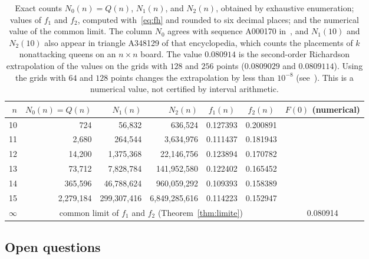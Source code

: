 \begin{table}[ht] \centering \small \begin{tabular}{rrrrccc}
\toprule
$n$ & $N_0(n)=Q(n)$ & $N_1(n)$ & $N_2(n)$ & $f_1(n)$ & $f_2(n)$ & $F(0)$ (numerical)\\
\midrule
10 & 724 & 56,832 & 636,524 & 0.127393 & 0.200891 & \\
11 & 2,680 & 264,544 & 3,634,976 & 0.111437 & 0.181943 & \\
12 & 14,200 & 1,375,368 & 22,146,756 & 0.123894 & 0.170782 & \\
13 & 73,712 & 7,828,784 & 141,952,580 & 0.122402 & 0.165452 & \\
14 & 365,596 & 46,788,624 & 960,059,292 & 0.109393 & 0.158389 & \\
15 & 2,279,184 & 299,307,416 & 6,849,285,616 & 0.114223 & 0.152947 & \\
$\infty$ & \multicolumn{5}{c}{common limit of $f_1$ and $f_2$ (Theorem~\ref{thm:limite})} & 0.080914\\
\bottomrule
\end{tabular}
\caption{Exact counts $N_0(n)=Q(n)$, $N_1(n)$, and $N_2(n)$, obtained by exhaustive enumeration; values of
$f_1$ and $f_2$,
computed with~\eqref{eq:fh} and rounded to six decimal places; and the numerical value of the common limit.
The column $N_0$ agrees
with sequence A000170 in~\cite{OEIS}, and $N_1(10)$ and $N_2(10)$ also appear in triangle A348129
of that encyclopedia, which counts the placements of $k$ nonattacking queens on an $n\times n$ board.
The value $0.080914$ is the second-order Richardson extrapolation of
the values on the
grids with $128$ and $256$ points ($0.0809029$ and $0.0809114$). Using the grids with $64$ and $128$ points
changes the extrapolation
by less than $10^{-8}$ (see~\cite[Section~9]{Perfil}). This is a numerical value, not certified by interval
arithmetic.} \label{tab:ilustracion}
\end{table}

\subsection{Open questions}

